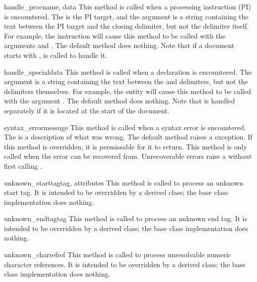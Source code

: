 \begin{funcdesc}{handle_proc}{name, data}
This method is called when a processing instruction (PI) is
encountered.  The  is the PI target, and the 
argument is a string containing the text between the PI target and the
closing delimiter, but not the delimiter itself.  For example, the
instruction  will cause this method to be called
with the arguments  and .  The default method
does nothing.  Note that if a document starts with ,  is called to handle it.
\end{funcdesc}

\begin{funcdesc}{handle_special}{data}
This method is called when a declaration is encountered.  The
 argument is a string containing the text between the
\samp{<!} and \samp{>} delimiters, but not the delimiters
themselves.  For example, the entity  will
cause this method to be called with the argument .  The
default method does nothing.  Note that  is
handled separately if it is located at the start of the document.
\end{funcdesc}

\begin{funcdesc}{syntax_error}{message}
This method is called when a syntax error is encountered.  The
 is a description of what was wrong.  The default method 
raises a  exception.  If this method is
overridden, it is permissable for it to return.  This method is only
called when the error can be recovered from.  Unrecoverable errors
raise a  without first calling
.
\end{funcdesc}

\begin{funcdesc}{unknown_starttag}{tag, attributes}
This method is called to process an unknown start tag.  It is intended
to be overridden by a derived class; the base class implementation
does nothing.
\end{funcdesc}

\begin{funcdesc}{unknown_endtag}{tag}
This method is called to process an unknown end tag.  It is intended
to be overridden by a derived class; the base class implementation
does nothing.
\end{funcdesc}

\begin{funcdesc}{unknown_charref}{ref}
This method is called to process unresolvable numeric character
references.  It is intended to be overridden by a derived class; the
base class implementation does nothing.
\end{funcdesc}


